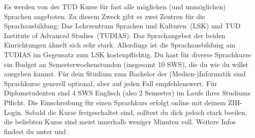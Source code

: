 Es werden von der TUD Kurse für fast alle möglichen (und unmöglichen) Sprachen angeboten.
Zu diesem Zweck gibt es zwei Zentren für die Sprachausbildung: Das \glqq Lehrzentrum Sprachen und Kulturen\grqq\ (LSK) und \glqq TUD Institute of Advanced Studies\grqq\ (TUDIAS).
Das Sprachangebot der beiden Einrichtungen ähnelt sich sehr stark. Allerdings ist die Sprachausbildung am TUDIAS im Gegensatz zum LSK kostenpflichtig.
Du hast für diverse Sprachkurse ein Budget an Semesterwochenstunden (insgesamt 10 SWS), die du wie du willst ausgeben kannst.
Für dein Studium zum Bachelor der (Medien-)Informatik sind Sprachkurse generell optional, aber auf jeden Fall empfehlenswert.
Für Diplomstudenten sind 4 SWS Englisch (also 2 Semester) im Laufe ihres Studiums Pflicht.
Die Einschreibung für einen Sprachkurs erfolgt online  mit deinem ZIH-Login.
Sobald die Kurse freigeschaltet sind, solltest du dich jedoch stark beeilen, die beliebten Kurse sind meist innerhalb weniger Minuten voll.
Weitere Infos findest du unter  und .
